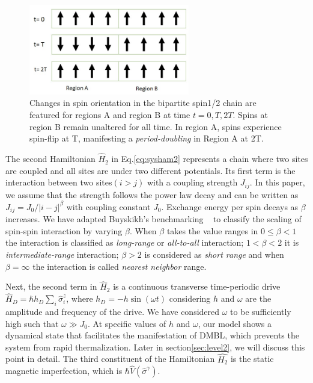 \documentclass[%
reprint,
superscriptaddress,
amsmath,amssymb,showkeys,
aps,
prb,
]{revtex4-2}
\begin{document}
	\begin{figure}[t!]
		\centering
		\includegraphics[width=7.0cm]{pic_regions.jpg}
		\caption{Changes in spin orientation in the bipartite spin1/2 chain are featured for regions A and region B at time $t= 0, T, 2T$. Spins at region B remain unaltered for all time. In region A, spins experience spin-flip at T, manifesting a \textit{period-doubling} in Region A at 2T.}
		\label{Fig:spinflip}
	\end{figure}
	
	The second Hamiltonian $\hat{H}_2$ in Eq.\eqref{eq:sysham2} represents a chain where two sites are coupled and all sites are under two different potentials. Its first term is the interaction between two sites$(i>j)$ with a coupling strength $J_{ij}$. In this paper, we assume that the strength follows the power law decay and can be written as $J_{ij}={J_0}/{|i-j|^\beta}$ with coupling constant $J_0$.
	Exchange energy per spin decays as $\beta$ increases. We have adapted Buyskikh's benchmarking ~\cite{buyskikh_entanglement_2016} to classify the scaling of spin-spin interaction by varying $\beta$. When $\beta$ takes the value ranges in  $0 \leq \beta <1$ the interaction is classified as \textit{long-range} or \textit{all-to-all} interaction; $1<\beta<2$ it is \textit{intermediate-range} interaction; $\beta > 2$ is considered as \textit{short range} and when $\beta= \infty$ the interaction is called \textit{nearest neighbor} range.
	
	
	Next, the second term in $\hat{H}_2$ is a continuous transverse time-periodic drive $\displaystyle \hat{H}_D=\hbar h_D \sum_i\hat{\sigma}^z_i$, where $\displaystyle h_D = -h\sin{(\omega t)}$ considering $h$ and $\omega$ are the amplitude and frequency of the drive. We have considered $\omega$ to be sufficiently high such that $\omega\gg J_0$. At specific values of $h$ and $\omega$, our model shows a dynamical state that facilitates the manifestation of DMBL, which prevents the system from rapid thermalization. Later in section\ref{sec:level2}, we will discuss this point in detail. 
	The third constituent of the Hamiltonian $\hat{H_2}$ is the static magnetic imperfection, which is $\displaystyle{\hbar\hat{V}(\hat{\sigma}^{\gamma})}$. 
	
\end{document}
